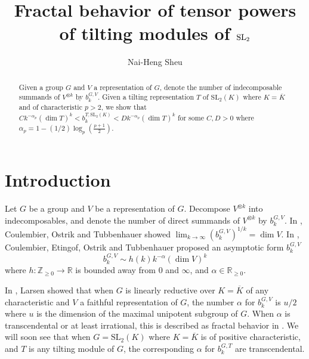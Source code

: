 \documentclass[11 pt]{amsart}
\title{ Fractal behavior of tensor powers of tilting modules of $\SL_2$}
\author{Nai-Heng Sheu}
\theoremstyle{plain}
\theoremstyle{definition}
\theoremstyle{remark}
\def\R{\mathbb{R}}
\def\Z{\mathbb{Z}}
\def\SL{\text{SL}}
\def\xx{\otimes}
\def\ch{\text{characteristic}}
\begin{document}
\begin{abstract}
Given a group $G$ and $V$ a representation of $G$, denote the number of indecomposable summands of $V^{\xx k}$ by $b_k^{G, V}$. 
   Given a tilting representation $T$ of $\SL_2(K)$ where $K=\overline{K}$ and of $\ch$ $p>2$, we show that $Ck^{-\alpha_p}(\dim T)^k<b_k^{T, \SL_2(K)}<Dk^{-\alpha_p}(\dim T)^k$ for some $C, D>0$ where $\alpha_p=1-(1/2)\log_p(\frac{p+1}{2}).$ 
\end{abstract}

\maketitle



\section{Introduction}

Let $G$ be a group and $V$ be a representation of $G$. Decompose $V^{\otimes k}$ into indecomposables, and denote the number of direct summands of $V^{\xx k}$ by $b_k^{G, V}$. In \cite{coulembier2024growth}, Coulembier, Ostrik and Tubbenhauer showed $\lim_{k \to \infty} (b_k^{G, V})^{1/k}=\dim V.$ In \cite{coulembier2024fractalbehaviortensorpowers}, Coulembier, Etingof, Ostrik and Tubbenhauer proposed an asymptotic form $b_k^{G, V}$  
\begin{equation*}
    b^{G, V}_k \sim  h(k)k^{-\alpha} (\dim V)^k
\end{equation*}
where $h: \Z_{\ge 0} \to \R$ is bounded away from $0$ and $\infty$, and $\alpha \in \R_{\ge 0}$. 

In \cite{larsen2025tensorpowerasymptoticslinearly}, Larsen showed that when $G$ is linearly reductive over $K=\overline{K}$ of any characteristic and $V$ a faithful representation of $G$, the number $\alpha$ for $b_k^{G, V}$ is $u/2$ where $u$ is the dimension of the maximal unipotent subgroup of $G$. When $\alpha$ is transcendental or at least irrational, this is described as fractal behavior in \cite{coulembier2024fractalbehaviortensorpowers}.  We will soon see that when $G=\SL_2(K)$ where $K=\overline{K}$ is of positive characteristic, and $T$ is any tilting module of $G$, the corresponding $\alpha$ for $b_k^{G, T}$ are transcendental. 




\end{document}
